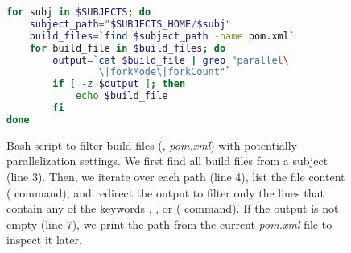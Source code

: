 \begin{figure}[h!]
\centering
\scriptsize
{}
\begin{lstlisting}[language=Bash]
for subj in $SUBJECTS; do
    subject_path="$SUBJECTS_HOME/$subj"
    build_files=`find $subject_path -name pom.xml`
    for build_file in $build_files; do
        output=`cat $build_file | grep "parallel\
                \|forkMode\|forkCount"`
        if [ -z $output ]; then
            echo $build_file
        fi
done
\end{lstlisting}
    \caption{\label{fig:discovery-step} Bash script to filter
    build files (\ie, \emph{pom.xml}) with potentially parallelization
    settings. We first find all build files from a subject (line 3).
    Then, we iterate over each path (line 4), list the file content
    (\CodeIn{cat} command), and redirect the output to filter only the
    lines that contain any of the keywords \CodeIn{parallel},
    , or  ( command).
    If the output is not empty (line 7), we print the path from the
    current \emph{pom.xml} file to inspect it later.}
\end{figure}

